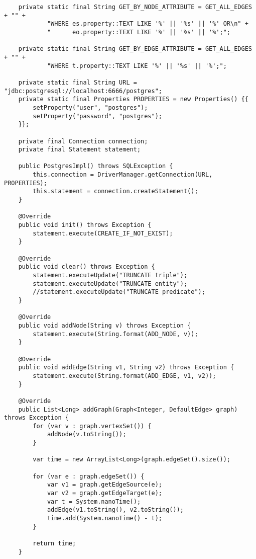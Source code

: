 \begin{lstlisting}
    private static final String GET_BY_NODE_ATTRIBUTE = GET_ALL_EDGES + "" +
            "WHERE es.property::TEXT LIKE '%' || '%s' || '%' OR\n" +
            "      eo.property::TEXT LIKE '%' || '%s' || '%';";

    private static final String GET_BY_EDGE_ATTRIBUTE = GET_ALL_EDGES + "" +
            "WHERE t.property::TEXT LIKE '%' || '%s' || '%';";

    private static final String URL = "jdbc:postgresql://localhost:6666/postgres";
    private static final Properties PROPERTIES = new Properties() {{
        setProperty("user", "postgres");
        setProperty("password", "postgres");
    }};

    private final Connection connection;
    private final Statement statement;

    public PostgresImpl() throws SQLException {
        this.connection = DriverManager.getConnection(URL, PROPERTIES);
        this.statement = connection.createStatement();
    }

    @Override
    public void init() throws Exception {
        statement.execute(CREATE_IF_NOT_EXIST);
    }

    @Override
    public void clear() throws Exception {
        statement.executeUpdate("TRUNCATE triple");
        statement.executeUpdate("TRUNCATE entity");
        //statement.executeUpdate("TRUNCATE predicate");
    }

    @Override
    public void addNode(String v) throws Exception {
        statement.execute(String.format(ADD_NODE, v));
    }

    @Override
    public void addEdge(String v1, String v2) throws Exception {
        statement.execute(String.format(ADD_EDGE, v1, v2));
    }

    @Override
    public List<Long> addGraph(Graph<Integer, DefaultEdge> graph) throws Exception {
        for (var v : graph.vertexSet()) {
            addNode(v.toString());
        }

        var time = new ArrayList<Long>(graph.edgeSet().size());

        for (var e : graph.edgeSet()) {
            var v1 = graph.getEdgeSource(e);
            var v2 = graph.getEdgeTarget(e);
            var t = System.nanoTime();
            addEdge(v1.toString(), v2.toString());
            time.add(System.nanoTime() - t);
        }

        return time;
    }


\end{lstlisting}
